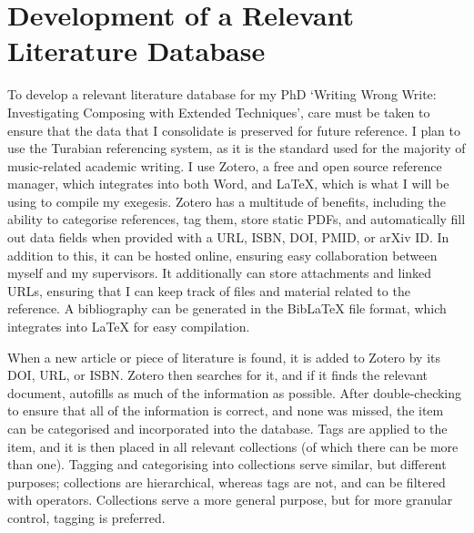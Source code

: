 \section{Development of a Relevant Literature Database}



To develop a relevant literature database for my PhD `Writing Wrong Write: Investigating Composing with Extended Techniques', care must be taken to ensure that the data that I consolidate is preserved for future reference.
I plan to use the Turabian referencing system, as it is the standard used for the majority of music-related academic writing.
I use Zotero, a free and open source reference manager, which integrates into both Word, and \LaTeX, which is what I will be using to compile my exegesis.
Zotero has a multitude of benefits, including the ability to categorise references, tag them, store static PDFs, and automatically fill out data fields when provided with a URL, ISBN, DOI, PMID, or arXiv ID.
In addition to this, it can be hosted online, ensuring easy collaboration between myself and my supervisors. 
It additionally can store attachments and linked URLs, ensuring that I can keep track of files and material related to the reference.
A bibliography can be generated in the BibLaTeX file format, which integrates into LaTeX for easy compilation. 

When a new article or piece of literature is found, it is added to Zotero by its DOI, URL, or ISBN.
Zotero then searches for it, and if it finds the relevant document, autofills as much of the information as possible.
After double-checking to ensure that all of the information is correct, and none was missed, the item can be categorised and incorporated into the database.
Tags are applied to the item, and it is then placed in all relevant collections (of which there can be more than one).
Tagging and categorising into collections serve similar, but different purposes; collections are hierarchical, whereas tags are not, and can be filtered with operators.
Collections serve a more general purpose, but for more granular control, tagging is preferred. 

